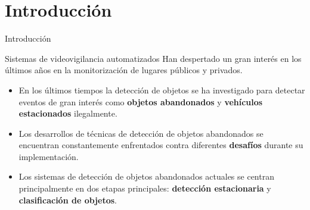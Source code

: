 \section{Introducción}

\begin{frame}{Introducción}

\begin{block}{Sistemas de videovigilancia automatizados}
\justifying
Han despertado un gran interés en los últimos años en la monitorización de lugares públicos y privados.
\vspace{0.2cm}
\end{block}

\begin{itemize}
    \justifying
    \item En los últimos tiempos la detección de objetos se ha investigado para detectar eventos de gran interés como \textbf{objetos abandonados} y \textbf{vehículos estacionados} ilegalmente.
    \item Los desarrollos de técnicas de detección de objetos abandonados se encuentran constantemente enfrentados contra diferentes \textbf{desafíos} durante su implementación.
    \item Los sistemas de detección de objetos abandonados actuales se centran principalmente en dos etapas principales: \textbf{detección estacionaria} y \textbf{clasificación de objetos}.
\end{itemize}

\end{frame}


